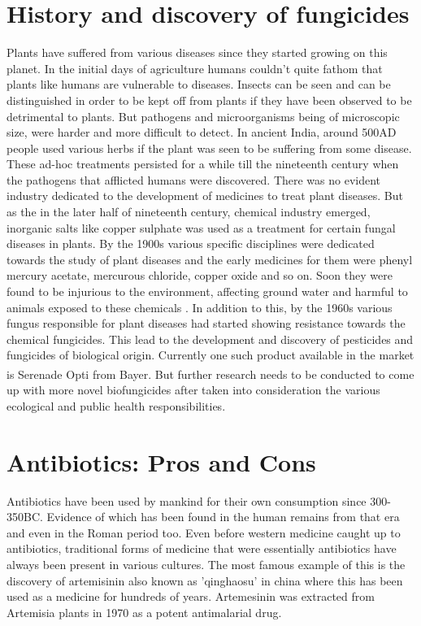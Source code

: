 \section{History and discovery of fungicides}
Plants have suffered from various diseases since they started growing on this planet.
In the initial days of agriculture humans couldn't quite fathom that plants like humans
are vulnerable to diseases. Insects can be seen and can be distinguished in order to be kept off from plants if they have been observed to be detrimental to plants.\cite{russell2005} But pathogens and microorganisms being of microscopic size, were harder and more difficult to detect. In ancient India, around 500AD people used various herbs if the plant was seen to be suffering from some disease. These ad-hoc treatments persisted for a while till the nineteenth century when the pathogens that afflicted humans were discovered. There was no evident industry dedicated to the development of medicines to treat plant diseases. But as the in the later half of nineteenth century, chemical industry emerged, inorganic salts like copper sulphate was used as a treatment for certain fungal diseases in plants.\cite{russell2005} By the 1900s various specific disciplines were dedicated towards the study of plant diseases and the early medicines for them were phenyl mercury acetate, mercurous chloride, copper oxide and so on. Soon they were found to be injurious to the environment, affecting ground water and harmful to animals exposed to these chemicals . In addition to this, by the 1960s various fungus responsible for plant diseases had started showing resistance towards the chemical fungicides. This lead to the development and discovery of pesticides and fungicides of biological origin. \cite{russell2005} Currently one such product available in the market is Serenade \textsuperscript{\textregistered} Opti from Bayer. But further research needs to be conducted to come up with more novel biofungicides after taken into consideration the various ecological and public health responsibilities.\cite{Avis2016}

\section{Antibiotics: Pros and Cons}
Antibiotics have been used by mankind for their own consumption since 300-350BC. Evidence of which has been found in the 
human remains from that era and even in the Roman period too. \cite{Armelagos2010, 
Villanueva1980, Anderson1989} 
Even before western medicine caught up to antibiotics, traditional forms 
of medicine that were essentially antibiotics have always been present 
in various cultures.\cite{Aminov2010} The most famous example of this is 
the discovery of  artemisinin also known as 'qinghaosu' in china where 
this has been used as a medicine for hundreds of years. Artemesinin was 
extracted from  Artemisia plants in 1970 as a potent antimalarial 
drug.\cite{Su2009}

